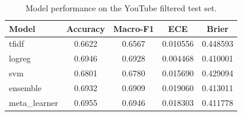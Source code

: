 \begin{table}[htbp]
\centering
\caption{Model performance on the YouTube filtered test set.}
\label{tab:youtube_filtered_model_performance}
\begin{tabular}{lcccc}
\toprule
\textbf{Model} & \textbf{Accuracy} & \textbf{Macro-F1} & \textbf{ECE} & \textbf{Brier} \\
\midrule
tfidf & 0.6622 & 0.6567 & 0.010556 & 0.448593 \\
logreg & 0.6946 & 0.6928 & 0.004468 & 0.410001 \\
svm & 0.6801 & 0.6780 & 0.015690 & 0.429094 \\
ensemble & 0.6932 & 0.6909 & 0.019060 & 0.413011 \\
meta_learner & 0.6955 & 0.6946 & 0.018303 & 0.411778 \\
\bottomrule
\end{tabular}
\end{table}
